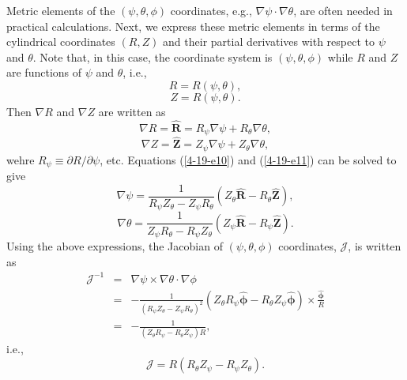 \documentclass{llncs}
\newcommand{\tmmathbf}[1]{\ensuremath{\boldsymbol{#1}}}
\begin{document}
Metric elements of the $(\psi, \theta, \phi)$ coordinates, e.g., $\nabla \psi
\cdot \nabla \theta$, are often needed in practical calculations. Next, we
express these metric elements in terms of the cylindrical coordinates $(R, Z)$
and their partial derivatives with respect to $\psi$ and $\theta$. Note that,
in this case, the coordinate system is $(\psi, \theta, \phi)$ while $R$ and
$Z$ are functions of $\psi$ and $\theta$, i.e.,
\begin{equation}
  R = R (\psi, \theta),
\end{equation}
\begin{equation}
  Z = R (\psi, \theta) .
\end{equation}
Then $\nabla R$ and $\nabla Z$ are written as
\begin{equation}
  \label{4-19-e10} \nabla R = \hat{\mathbf{R}} = R_{\psi} \nabla \psi +
  R_{\theta} \nabla \theta,
\end{equation}
\begin{equation}
  \label{4-19-e11} \nabla Z = \hat{\mathbf{Z}} = Z_{\psi} \nabla \psi +
  Z_{\theta} \nabla \theta,
\end{equation}
wehre $R_{\psi} \equiv \partial R / \partial \psi$, etc. Equations
(\ref{4-19-e10}) and (\ref{4-19-e11}) can be solved to give
\begin{equation}
  \label{4-19-e2} \nabla \psi = \frac{1}{R_{\psi} Z_{\theta} - Z_{\psi}
  R_{\theta}} (Z_{\theta} \hat{\mathbf{R}} - R_{\theta} \hat{\mathbf{Z}}),
\end{equation}
\begin{equation}
  \label{4-19-e3} \nabla \theta = \frac{1}{Z_{\psi} R_{\theta} - R_{\psi}
  Z_{\theta}} (Z_{\psi} \hat{\mathbf{R}} - R_{\psi} \hat{\mathbf{Z}}) .
\end{equation}
Using the above expressions, the Jacobian of $(\psi, \theta, \phi)$
coordinates, $\mathcal{J}$, is written as
\begin{eqnarray}
  \mathcal{J}^{- 1} & = & \nabla \psi \times \nabla \theta \cdot \nabla \phi
  \nonumber\\
  & = & - \frac{1}{(R_{\psi} Z_{\theta} - Z_{\psi} R_{\theta})^2} (Z_{\theta}
  R_{\psi} \hat{\tmmathbf{\phi}} - R_{\theta} Z_{\psi} \hat{\tmmathbf{\phi}})
  \times \frac{\hat{\tmmathbf{\phi}}}{R} \nonumber\\
  & = & - \frac{1}{(Z_{\theta} R_{\psi} - R_{\theta} Z_{\psi}) R}, 
\end{eqnarray}
i.e.,
\begin{equation}
  \label{4-19-e1} \mathcal{J}= R (R_{\theta} Z_{\psi} - R_{\psi} Z_{\theta}) .
\end{equation}
\end{document}
